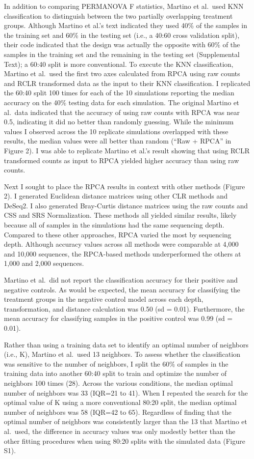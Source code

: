 \documentclass[
  11pt,
]{article}
\begin{document}
In addition to comparing PERMANOVA F statistics, Martino et al.~used KNN
classification to distinguish between the two partially overlapping
treatment groups. Although Martino et al.'s text indicated they used
40\% of the samples in the training set and 60\% in the testing set
(i.e., a 40:60 cross validation split), their code indicated that the
design was actually the opposite with 60\% of the samples in the
training set and the remaining in the testing set (Supplemental Text); a
60:40 split is more conventional. To execute the KNN classification,
Martino et al.~used the first two axes calculated from RPCA using raw
counts and RCLR transformed data as the input to their KNN
classification. I replicated the 60:40 split 100 times for each of the
10 simulations reporting the median accuracy on the 40\% testing data
for each simulation. The original Martino et al.~data indicated that the
accuracy of using raw counts with RPCA was near 0.5, indicating it did
no better than randomly guessing. While the minimum values I observed
across the 10 replicate simulations overlapped with these results, the
median values were all better than random (``Raw + RPCA'' in Figure 2).
I was able to replicate Martino et al.'s result showing that using RCLR
transformed counts as input to RPCA yielded higher accuracy than using
raw counts.

Next I sought to place the RPCA results in context with other methods
(Figure 2). I generated Euclidean distance matrices using other CLR
methods and DeSeq2. I also generated Bray-Curtis distance matrices using
the raw counts and CSS and SRS Normalization. These methods all yielded
similar results, likely because all of samples in the simulations had
the same sequencing depth. Compared to these other approaches, RPCA
varied the most by sequencing depth. Although accuracy values across all
methods were comparable at 4,000 and 10,000 sequences, the RPCA-based
methods underperformed the others at 1,000 and 2,000 sequences.

Martino et al.~did not report the classification accuracy for their
positive and negative controls. As would be expected, the mean accuracy
for classifying the treatment groups in the negative control model
across each depth, transformation, and distance calculation was 0.50 (sd
= 0.01). Furthermore, the mean accuracy for classifying samples in the
positive control was 0.99 (sd = 0.01).

Rather than using a training data set to identify an optimal number of
neighbors (i.e., K), Martino et al.~used 13 neighbors. To assess whether
the classification was sensitive to the number of neighbors, I split the
60\% of samples in the training data into another 60:40 split to train
and optimize the number of neighbors 100 times (28). Across the various
conditions, the median optimal number of neighbors was 33 (IQR=21 to
41). When I repeated the search for the optimal value of K using a more
conventional 80:20 split, the median optimal number of neighbors was 58
(IQR=42 to 65). Regardless of finding that the optimal number of
neighbors was consistently larger than the 13 that Martino et al.~used,
the difference in accuracy values was only modestly better than the
other fitting procedures when using 80:20 splits with the simulated data
(Figure S1).
\end{document}
